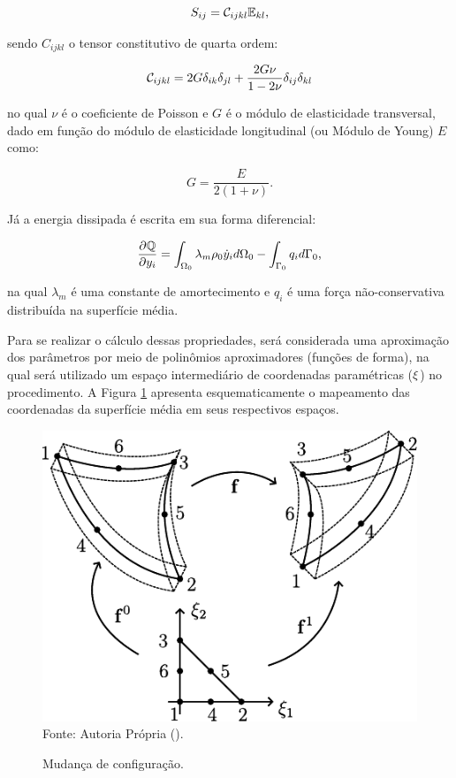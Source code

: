 \documentclass[_ArquivoPrincipal.tex]{subfiles}
\begin{document}
\begin{equation}
    S_{ij}=\mathcal{C}_{ijkl}\mathbb{E}_{kl}\text{,}
    \label{eq:CSD-S}
\end{equation}

\noindent sendo $C_{ijkl}$ o tensor constitutivo de quarta ordem:

\begin{equation}
    \mathcal{C}_{ijkl}=2G\delta_{ik}\delta_{jl}+\frac{2G\nu}{1-2\nu}\delta_{ij}\delta_{kl}
\end{equation}

\noindent no qual $\nu$ é o coeficiente de Poisson e $G$ é o módulo de elasticidade transversal, dado em função do módulo de elasticidade longitudinal (ou Módulo de Young) $E$ como:

\begin{equation}
    G=\frac{E}{2(1+\nu)}\text{.}
\end{equation}

Já a energia dissipada é escrita em sua forma diferencial:

\begin{equation}
    \frac{\partial{\mathbb{Q}}}{\partial{y_i}}=\int_{\Omega_0}{\lambda_m\rho_0\dot{y}_i d\Omega_0}-\int_{\Gamma_0}{q_i d\Gamma_0}\text{,}
\end{equation}

\noindent na qual $\lambda_m$ é uma constante de amortecimento e $q_i$ é uma força não-conservativa distribuída na superfície média.

Para se realizar o cálculo dessas propriedades, será considerada uma aproximação dos parâmetros por meio de polinômios aproximadores (funções de forma), na qual será utilizado um espaço intermediário de coordenadas paramétricas ($\mathbf{\xi}$) no procedimento. A Figura \ref{fig:Mapeamento} apresenta esquematicamente o mapeamento das coordenadas da superfície média em seus respectivos espaços.

\begin{figure}[h]
    \centering
    \caption{Mudança de configuração.}
    \includegraphics[width=.4\linewidth]{../../Figuras/Mapeamento.pdf}
    \\Fonte: Autoria Própria (\the\year).
    \label{fig:Mapeamento}
\end{figure}
\end{document}

